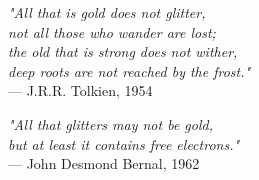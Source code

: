 \begin{flushright}
\emph{"All that is gold does not glitter,\\not all those who wander are lost;\\the old that is strong does not wither,\\deep roots are not reached by the frost."}\\
 — J.R.R. Tolkien, 1954
\end{flushright}
\vspace{2em}
\begin{flushright}
\emph{"All that glitters may not be gold,\\but at least it contains free electrons."}\\
 — John Desmond Bernal, 1962
\end{flushright}
